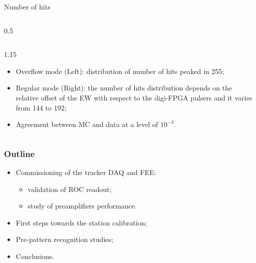 \documentclass{beamer}
\begin{document}
\begin{frame}{Number of hits}
\begin{columns}
\begin{column}{0.5\framewidth}
\begin{figure}[H]
          \label{fig:un} 
          \end{figure} 
    \end{column}
\end{columns}
 \vspace{-3mm}
 \begin{columns}
    \begin{column}{1.15\framewidth}
     \begin{itemize}
        \item Overflow mode (Left): distribution of number of hits peaked in 255; 
        \item Regular mode (Right): the number of hits  distribution depends on the relative offset of the EW  with respect to the digi-FPGA pulsers and it varies from 
144 to 192;
            \item Agreement between MC and data at a level of $10^{-3}$.

    \end{itemize}  
    \end{column}
    \end{columns}
\end{frame}





\begin{frame}
    \frametitle{Outline}
    
\begin{itemize}
\item Commissioning of the tracker DAQ and FEE:
\begin{itemize}
         \vspace{2mm}

    \item \textcolor{mygray}{validation of ROC readout;}
             \vspace{1.5mm}

    \item study of preamplifiers performance.
\end{itemize}
\vspace{4mm}
    \item \textcolor{mygray}{First steps towards the station calibration;}
    \vspace{6mm}

    \item \textcolor{mygray}{Pre-pattern recognition studies;}
    \vspace{6mm}

    \item \textcolor{mygray}{Conclusions.}
\end{itemize}
\end{frame}
\end{document}
